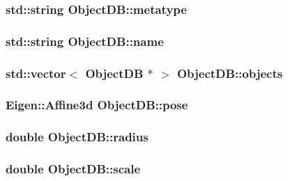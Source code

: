 \hypertarget{structObjectDB_a0f12d7a7c86ff08dfd2ee1efc93d2c89}{
\subsubsection[{metatype}]{\setlength{\rightskip}{0pt plus 5cm}std\-::string Object\-D\-B\-::metatype}}\label{structObjectDB_a0f12d7a7c86ff08dfd2ee1efc93d2c89}
\hypertarget{structObjectDB_aac9d3fa047f7df1d8981fd3c6e97dd25}{
\subsubsection[{name}]{\setlength{\rightskip}{0pt plus 5cm}std\-::string Object\-D\-B\-::name}}\label{structObjectDB_aac9d3fa047f7df1d8981fd3c6e97dd25}
\hypertarget{structObjectDB_abb9b942eb8b04ead17f60ce1b1b89ce7}{
\subsubsection[{objects}]{\setlength{\rightskip}{0pt plus 5cm}std\-::vector$<$ {\bf Object\-D\-B} $\ast$ $>$ Object\-D\-B\-::objects\hspace{0.3cm}{\ttfamily [static]}}}\label{structObjectDB_abb9b942eb8b04ead17f60ce1b1b89ce7}
\hypertarget{structObjectDB_a8026e6c724f6193ab457c5f0ad924551}{
\subsubsection[{pose}]{\setlength{\rightskip}{0pt plus 5cm}Eigen\-::\-Affine3d Object\-D\-B\-::pose}}\label{structObjectDB_a8026e6c724f6193ab457c5f0ad924551}
\hypertarget{structObjectDB_acd411795d2b56563c2fcfca77d25fc0c}{
\subsubsection[{radius}]{\setlength{\rightskip}{0pt plus 5cm}double Object\-D\-B\-::radius}}\label{structObjectDB_acd411795d2b56563c2fcfca77d25fc0c}
\hypertarget{structObjectDB_a8275f4314ddaba5cf47d65fac944ea96}{
\subsubsection[{scale}]{\setlength{\rightskip}{0pt plus 5cm}double Object\-D\-B\-::scale}}\label{structObjectDB_a8275f4314ddaba5cf47d65fac944ea96}


